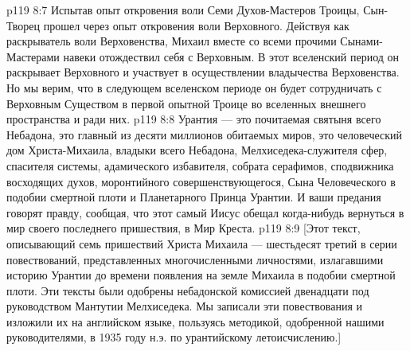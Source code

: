 \vs p119 8:7 Испытав опыт откровения воли Семи Духов\hyp{}Мастеров Троицы, Сын\hyp{}Творец прошел через опыт откровения воли Верховного. Действуя как раскрыватель воли Верховенства, Михаил вместе со всеми прочими Сынами\hyp{}Мастерами навеки отождествил себя с Верховным. В этот вселенский период он раскрывает Верховного и участвует в осуществлении владычества Верховенства. Но мы верим, что в следующем вселенском периоде он будет сотрудничать с Верховным Существом в первой опытной Троице во вселенных внешнего пространства и ради них.
\vs p119 8:8 \pc Урантия --- это почитаемая святыня всего Небадона, это главный из десяти миллионов обитаемых миров, это человеческий дом Христа\hyp{}Михаила, владыки всего Небадона, Мелхиседека\hyp{}служителя сфер, спасителя системы, адамического избавителя, собрата серафимов, сподвижника восходящих духов, моронтийного совершенствующегося, Сына Человеческого в подобии смертной плоти и Планетарного Принца Урантии. И ваши предания говорят правду, сообщая, что этот самый Иисус обещал когда\hyp{}нибудь вернуться в мир своего последнего пришествия, в Мир Креста.
\separatorline
\vsetoff
\vs p119 8:9 [Этот текст, описывающий семь пришествий Христа Михаила --- шестьдесят третий в серии повествований, представленных многочисленными личностями, излагавшими историю Урантии до времени появления на земле Михаила в подобии смертной плоти. Эти тексты были одобрены небадонской комиссией двенадцати под руководством Мантутии Мелхиседека. Мы записали эти повествования и изложили их на английском языке, пользуясь методикой, одобренной нашими руководителями, в 1935 году н.э. по урантийскому летоисчислению.]
